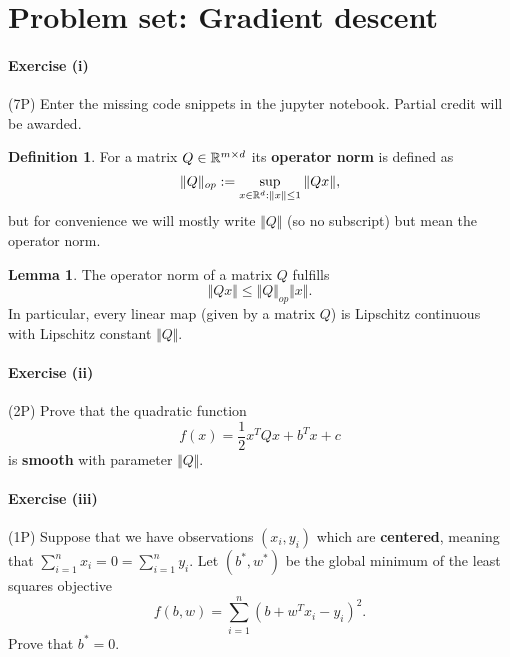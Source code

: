 \documentclass{scrartcl}
\theoremstyle{definition}
\newtheorem{definition}{Definition}[section]
\newtheorem{lemma}{Lemma}[section]
\begin{document}
\section*{Problem set: Gradient descent}%


\paragraph{Exercise (i)} (7P) Enter the missing code snippets in the jupyter notebook. Partial credit will be awarded.


\begin{definition}
  For a matrix $Q \in \mathbb{R}^{m \times d}$ its \textbf{operator norm} is defined as
  \begin{equation}
    \Vert Q \Vert_{op} := \sup_{x \in \mathbb{R}^d: \Vert x \Vert \le 1} \Vert Q x \Vert,
  \end{equation}
  but for convenience we will mostly write $\Vert Q \Vert$ (so no subscript) but mean the operator norm.
\end{definition}

\begin{lemma}%
  The operator norm of a matrix $Q$ fulfills
  \begin{equation}
    \Vert Qx \Vert \le \Vert Q \Vert_{op} \Vert x \Vert.
  \end{equation}
  In particular, every linear map (given by a matrix $Q$) is Lipschitz continuous with Lipschitz constant $\Vert Q \Vert$.
\end{lemma}


\paragraph{Exercise (ii)} (2P) Prove that the quadratic function
\begin{equation}
  f(x) = \frac{1}{2} x^T Q x +b^T x + c
\end{equation}
is \textbf{smooth} with parameter $\Vert Q \Vert$.


\paragraph{Exercise (iii)} (1P) Suppose that we have observations $(x_i, y_i)$ which are \textbf{centered}, meaning that $\sum_{i=1}^{n}x_i = 0 = \sum_{i=1}^{n}y_i$. Let $(b^*, w^*)$ be the global minimum of the least squares objective
\begin{equation}
  f(b, w) = \sum_{i=1}^{n} {(b + w^T x_i - y_i)}^2.
\end{equation}
Prove that $b^*=0$.
\end{document}
